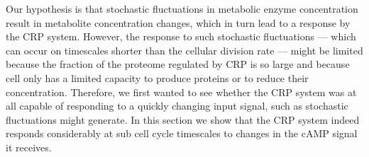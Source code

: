 Our hypothesis is that stochastic fluctuations in metabolic enzyme concentration result in metabolite concentration changes, which in turn lead to a response by the CRP system.
%
%
%
However, 
the response to such stochastic fluctuations --- which can occur on timescales shorter than the cellular division rate --- might be limited because 
the fraction of the proteome regulated by CRP is so large 
and because cell only has a limited capacity to produce proteins or to reduce their concentration.
%
%
%
%
Therefore, we first wanted to see whether the CRP system was at all capable of responding to a quickly changing input signal, such as stochastic fluctuations might generate.
%
In this section we show that the CRP system indeed responds considerably at sub cell cycle timescales to changes in the cAMP signal it receives.



